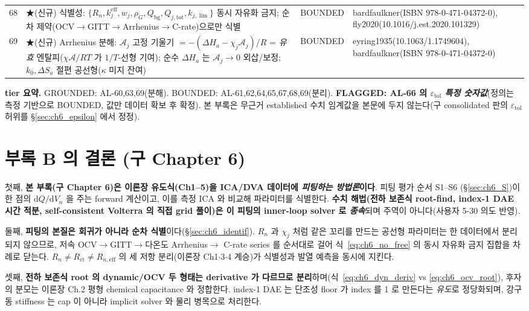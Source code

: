 \documentclass[11pt,a4paper]{article}
\newcommand{\dd}{\mathrm{d}}
\newcommand{\eff}{\mathrm{eff}}
\newcommand{\bg}{\mathrm{bg}}
\newcommand{\tot}{\mathrm{tot}}
\newcommand{\ct}{\mathrm{ct}}
\newcommand{\tol}{\mathrm{tol}}
\newcommand{\brk}{\discretionary{}{}{}}%
\begin{document}
{\begin{longtable}{p{} p{} p{} p{}}
68 & ★(신규) 식별성: $\{R_n,k_j^{\eff},w_j,\rho_G,Q_\bg,Q_{j,\tot},k_{j,\lim}\}$ 동시 자유화 금지; 순차 제약(OCV$\to$GITT$\to$Arrhenius$\to$C-rate)으로만 식별 & BOUNDED & bardfaulkner(ISBN 978-0-\brk 471-04372-0), fly2020(10.1016/\brk j.est.2020.101329) \\
69 & ★(신규) Arrhenius 분해: $\mathcal A_j$ 고정 기울기 $=-(\Delta H_a-\chi_j\mathcal A_j)/R$ = \emph{유효} 엔탈피($\chi\mathcal A/RT$ 가 $1/T$-선형 기여); 순수 $\Delta H_a$ 는 $\mathcal A_j\to0$ 외삽/보정; $k_0,\Delta S_a$ 절편 공선형($\kappa$ 미지 잔여) & BOUNDED & eyring1935(10.1063/\brk 1.1749604), bardfaulkner(ISBN 978-0-\brk 471-04372-0) \\
\bottomrule
\end{longtable}
}
\textbf{tier 요약.} GROUNDED: AL-60,63,69(분해). BOUNDED: AL-61,62,64,65,67,68,69(분리). \textbf{FLAGGED: AL-66 의
$\varepsilon_\tol$ \emph{특정 숫자값}}(정의는 측정 기반으로 BOUNDED, 값만 데이터 확보 후 확정). 본 부록은 무근거
established 수치 임계값을 본문에 두지 않는다(구 consolidated 판의 $\varepsilon_\tol$ 허위를 \S\ref{sec:ch6_epsilon}
에서 정정).

\section{부록 B 의 결론 (구 Chapter 6)}\label{sec:ch6_concl}
첫째, \textbf{본 부록(구 Chapter 6)은 이론장 유도식(Ch1--5)을 ICA/DVA 데이터에 \emph{피팅하는 방법론}이다}. 피팅 평가
순서 S1--S6 (\S\ref{sec:ch6_S})이 한 점의 $\dd Q/\dd V_n$ 을 주는 forward 계산이고, 이를 측정 ICA 와 비교해
파라미터를 식별한다. \textbf{수치 해법(전하 보존식 root-find, index-1 DAE 시간 적분, self-consistent Volterra 의
직접 grid 풀이)은 이 피팅의 inner-loop solver 로 \emph{종속}}되며 주역이 아니다(사용자 5-30 의도 반영).

둘째, \textbf{피팅의 본질은 회귀가 아니라 순차 식별}이다(\S\ref{sec:ch6_identif}). $R_n$ 과 $\chi_j$ 처럼 같은
꼬리를 만드는 공선형 파라미터는 한 데이터에서 분리되지 않으므로, 저속 OCV$\to$GITT$\to$다온도 Arrhenius$\to$
C-rate series 를 순서대로 걸어 식~\eqref{eq:ch6_no_free} 의 동시 자유화 금지 집합을 차례로 닫는다. $R_n\ne R_\ct
\ne R_{n,\eff}$ 의 세 저항 분리(이론장 Ch1$\cdot$3$\cdot$4 계승)가 식별성과 발열 예측을 동시에 지킨다.

셋째, \textbf{전하 보존식 root 의 dynamic/OCV 두 형태는 derivative 가 다르므로 분리}하며(식~\eqref{eq:ch6_dyn_deriv}
vs \eqref{eq:ch6_ocv_root}), 후자의 분모는 이론장 Ch.2 평형 chemical capacitance 와 정합한다. index-1 DAE 는 단조성
floor 가 index 를 1 로 만든다는 \emph{유도}로 정당화되며, 강구동 stiffness 는 cap 이 아니라 implicit solver 와
물리 병목으로 처리한다.
\end{document}
